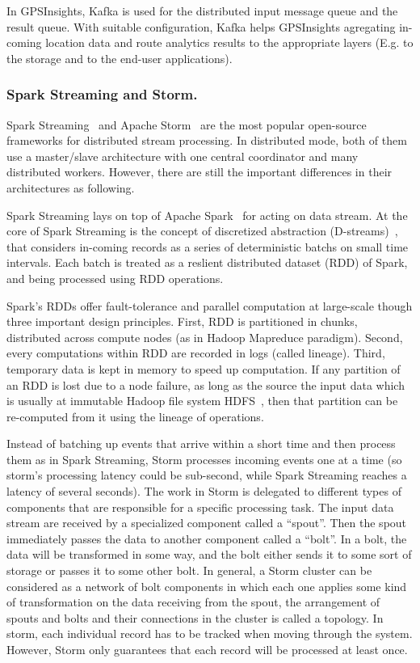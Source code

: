 \documentclass{acm_proc_article-sp}
\begin{document}
In GPSInsights, Kafka is used for the distributed input message queue and the result queue. With suitable configuration, Kafka helps GPSInsights agregating in-coming location data and route analytics results to the appropriate layers (E.g. to the storage and to the end-user applications).

\subsubsection{Spark Streaming and Storm.}

Spark Streaming~\cite{learningsparkbook,sparkstreamingweb} and Apache Storm~\cite{stormappliedbook,apachestormweb} are the most popular open-source frameworks for distributed stream processing. In distributed mode, both of them use a master/slave architecture with one central coordinator and many distributed workers. However, there are still the important differences in their architectures as following.

Spark Streaming lays on top of Apache Spark~\cite{Zaharia:2010:SCC:1863103.1863113} for acting on data stream.
 At the core of Spark Streaming is the concept of discretized abstraction (D-streams)~\cite{Zaharia:2013:DSF:2517349.2522737,Zaharia:2012:DSE:2342763.2342773}, that considers in-coming records as a series of deterministic batchs on small time intervals. Each batch is treated as a reslient distributed dataset (RDD) of Spark, and being processed using RDD operations. 

 Spark's RDDs offer fault-tolerance and parallel computation at large-scale though three important design principles. First, RDD is partitioned in chunks, distributed across compute nodes (as in Hadoop Mapreduce paradigm). Second, every computations within RDD are recorded in logs (called lineage). Third, temporary data is kept in memory to speed up computation. If any partition of an RDD is lost due to a node failure, as long as the source the input data which is usually at immutable Hadoop file system HDFS~\cite{shvachko2010hadoop}, then that partition can be re-computed from it using the lineage of operations.

Instead of batching up events that arrive within a short time and then process them as in Spark Streaming, Storm processes incoming events one at a time (so storm's processing latency could be sub-second, while Spark Streaming reaches a latency of several seconds). The work in Storm is delegated to different types of components that are responsible for a specific processing task. The input data stream are received by a specialized component called a ``spout''. Then the spout immediately passes the data to another component called a ``bolt''. In a bolt, the data will be transformed in some way, and the bolt either sends it to some sort of storage or passes it to some other bolt. In general, a Storm cluster can be considered as a network of bolt components in which each one applies some kind of transformation on the data receiving from the spout, the arrangement of spouts and bolts and their connections in the cluster is called a topology. In storm, each individual record has to be tracked when moving through the system. However, Storm only guarantees that each record will be processed at least once.
\end{document}
